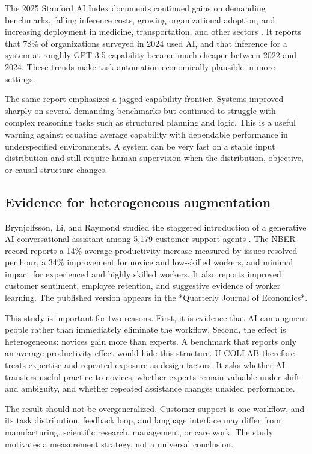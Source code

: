 \documentclass[conference]{IEEEtran}
\begin{document}
The 2025 Stanford AI Index documents continued gains on demanding benchmarks, falling inference costs, growing organizational adoption, and increasing deployment in medicine, transportation, and other sectors \cite{stanford2025}. It reports that 78\% of organizations surveyed in 2024 used AI, and that inference for a system at roughly GPT-3.5 capability became much cheaper between 2022 and 2024. These trends make task automation economically plausible in more settings.

The same report emphasizes a jagged capability frontier. Systems improved sharply on several demanding benchmarks but continued to struggle with complex reasoning tasks such as structured planning and logic. This is a useful warning against equating average capability with dependable performance in underspecified environments. A system can be very fast on a stable input distribution and still require human supervision when the distribution, objective, or causal structure changes.

\subsection{Evidence for heterogeneous augmentation}

Brynjolfsson, Li, and Raymond studied the staggered introduction of a generative AI conversational assistant among 5,179 customer-support agents \cite{brynjolfsson2025}. The NBER record reports a 14\% average productivity increase measured by issues resolved per hour, a 34\% improvement for novice and low-skilled workers, and minimal impact for experienced and highly skilled workers. It also reports improved customer sentiment, employee retention, and suggestive evidence of worker learning. The published version appears in the *Quarterly Journal of Economics*.

This study is important for two reasons. First, it is evidence that AI can augment people rather than immediately eliminate the workflow. Second, the effect is heterogeneous: novices gain more than experts. A benchmark that reports only an average productivity effect would hide this structure. U-COLLAB therefore treats expertise and repeated exposure as design factors. It asks whether AI transfers useful practice to novices, whether experts remain valuable under shift and ambiguity, and whether repeated assistance changes unaided performance.

The result should not be overgeneralized. Customer support is one workflow, and its task distribution, feedback loop, and language interface may differ from manufacturing, scientific research, management, or care work. The study motivates a measurement strategy, not a universal conclusion.
\end{document}
